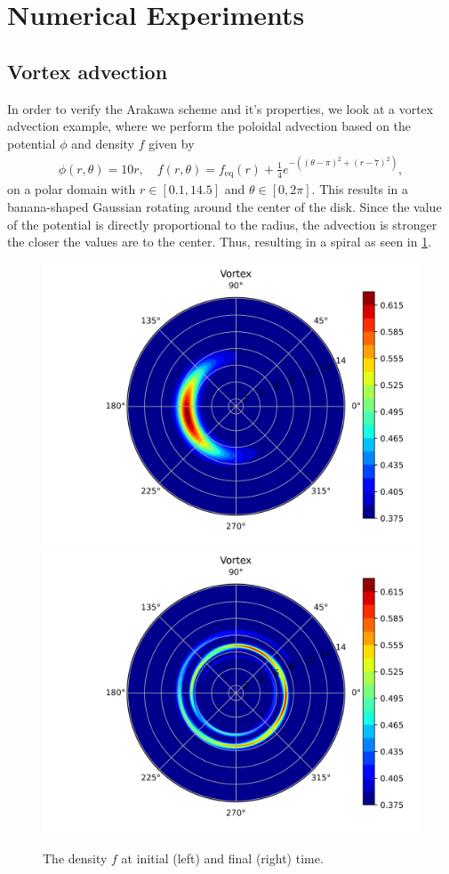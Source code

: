 

\section{Numerical Experiments}



\subsection{Vortex advection}

In order to verify the Arakawa scheme and it's properties, we look at a vortex advection example, where we perform the poloidal advection based on the potential $\phi$ and density $f$ given by 
\begin{align}
	\phi(r, \theta)  = 10 r, \quad f(r, \theta) = f_\text{eq}(r) + \frac14 e^{- ((\theta-\pi)^2 + (r -7)^2)},
\end{align}  
on a polar domain with $r \in [0.1, 14.5]$ and $\theta \in [0, 2\pi]$. This results in a banana-shaped Gaussian rotating around the center of the disk. Since the value of the potential is directly proportional to the radius, the advection is stronger the closer the values are to the center. Thus, resulting in a spiral as seen in \ref{fig:vortex}.

\begin{figure}[h]
	\centering
	\includegraphics[width=0.45\linewidth]{plots/vortex_init.png}
	\includegraphics[width=0.45\linewidth]{plots/vortex_final.png}
	\caption{The density $f$ at initial (left) and final (right) time.}
	\label{fig:vortex}
\end{figure}

